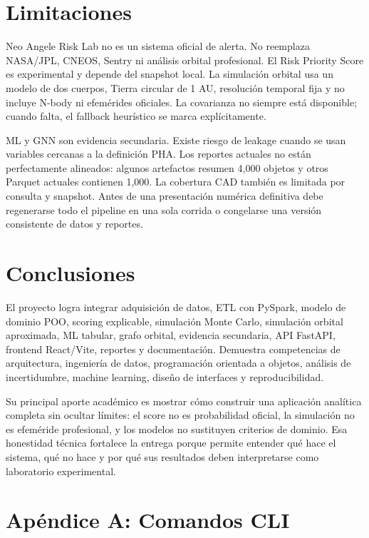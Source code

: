 \documentclass[12pt,a4paper]{report}
\begin{document}
\chapter{Limitaciones}

Neo Angele Risk Lab no es un sistema oficial de alerta. No reemplaza NASA/JPL, CNEOS, Sentry ni análisis orbital profesional. El Risk Priority Score es experimental y depende del snapshot local. La simulación orbital usa un modelo de dos cuerpos, Tierra circular de 1 AU, resolución temporal fija y no incluye N-body ni efemérides oficiales. La covarianza no siempre está disponible; cuando falta, el fallback heurístico se marca explícitamente.

ML y GNN son evidencia secundaria. Existe riesgo de leakage cuando se usan variables cercanas a la definición PHA. Los reportes actuales no están perfectamente alineados: algunos artefactos resumen 4,000 objetos y otros Parquet actuales contienen 1,000. La cobertura CAD también es limitada por consulta y snapshot. Antes de una presentación numérica definitiva debe regenerarse todo el pipeline en una sola corrida o congelarse una versión consistente de datos y reportes.

\chapter{Conclusiones}

El proyecto logra integrar adquisición de datos, ETL con PySpark, modelo de dominio POO, scoring explicable, simulación Monte Carlo, simulación orbital aproximada, ML tabular, grafo orbital, evidencia secundaria, API FastAPI, frontend React/Vite, reportes y documentación. Demuestra competencias de arquitectura, ingeniería de datos, programación orientada a objetos, análisis de incertidumbre, machine learning, diseño de interfaces y reproducibilidad.

Su principal aporte académico es mostrar cómo construir una aplicación analítica completa sin ocultar límites: el score no es probabilidad oficial, la simulación no es efeméride profesional, y los modelos no sustituyen criterios de dominio. Esa honestidad técnica fortalece la entrega porque permite entender qué hace el sistema, qué no hace y por qué sus resultados deben interpretarse como laboratorio experimental.

\appendix

\chapter{Apéndice A: Comandos CLI}
\end{document}

